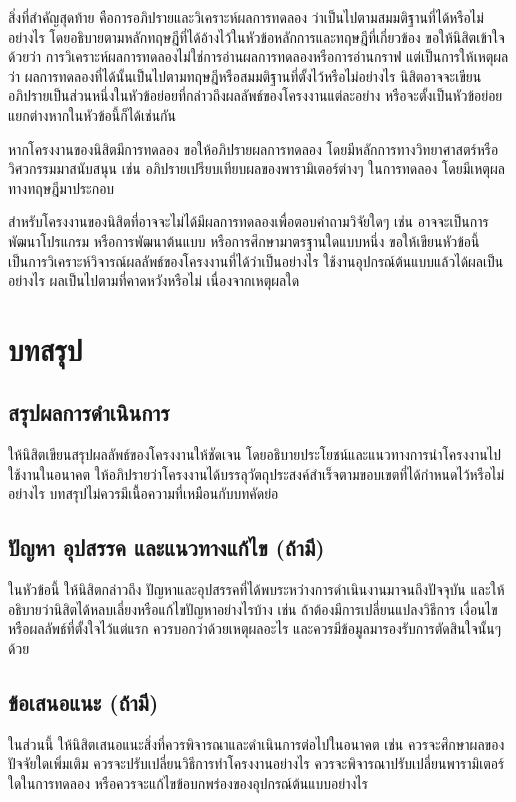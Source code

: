 \documentclass[11pt,a4paper]{article}
\begin{document}
สิ่งที่สำคัญสุดท้าย คือการอภิปรายและวิเคราะห์ผลการทดลอง ว่าเป็นไปตามสมมติฐานที่ได้หรือไม่อย่างไร โดยอธิบายตามหลักทฤษฎีที่ได้อ้างไว้ในหัวข้อหลักการและทฤษฎีที่เกี่ยวข้อง ขอให้นิสิตเข้าใจด้วยว่า การวิเคราะห์ผลการทดลองไม่ใช่การอ่านผลการทดลองหรือการอ่านกราฟ แต่เป็นการให้เหตุผลว่า ผลการทดลองที่ได้นั้นเป็นไปตามทฤษฎีหรือสมมติฐานที่ตั้งไว้หรือไม่อย่างไร นิสิตอาจจะเขียนอภิปรายเป็นส่วนหนึ่งในหัวข้อย่อยที่กล่าวถึงผลลัพธ์ของโครงงานแต่ละอย่าง หรือจะตั้งเป็นหัวข้อย่อยแยกต่างหากในหัวข้อนี้ก็ได้เช่นกัน


หากโครงงานของนิสิตมีการทดลอง ขอให้อภิปรายผลการทดลอง โดยมีหลักการทางวิทยาศาสตร์หรือวิศวกรรมมาสนับสนุน เช่น อภิปรายเปรียบเทียบผลของพารามิเตอร์ต่างๆ ในการทดลอง โดยมีเหตุผลทางทฤษฎีมาประกอบ


สำหรับโครงงานของนิสิตที่อาจจะไม่ได้มีผลการทดลองเพื่อตอบคำถามวิจัยใดๆ เช่น อาจจะเป็นการพัฒนาโปรแกรม หรือการพัฒนาต้นแบบ หรือการศึกษามาตรฐานใดแบบหนึ่ง ขอให้เขียนหัวข้อนี้เป็นการวิเคราะห์วิจารณ์ผลลัพธ์ของโครงงานที่ได้ว่าเป็นอย่างไร ใช้งานอุปกรณ์ต้นแบบแล้วได้ผลเป็นอย่างไร ผลเป็นไปตามที่คาดหวังหรือไม่ เนื่องจากเหตุผลใด

\section{บทสรุป}
\subsection{สรุปผลการดำเนินการ}
ให้นิสิตเขียนสรุปผลลัพธ์ของโครงงานให้ชัดเจน โดยอธิบายประโยชน์และแนวทางการนำโครงงานไปใช้งานในอนาคต ให้อภิปรายว่าโครงงานได้บรรลุวัตถุประสงค์สำเร็จตามขอบเขตที่ได้กำหนดไว้หรือไม่ อย่างไร บทสรุปไม่ควรมีเนื้อความที่เหมือนกับบทคัดย่อ

\subsection{ปัญหา อุปสรรค และแนวทางแก้ไข (ถ้ามี)}
ในหัวข้อนี้ ให้นิสิตกล่าวถึง ปัญหาและอุปสรรคที่ได้พบระหว่างการดำเนินงานมาจนถึงปัจจุบัน และให้อธิบายว่านิสิตได้หลบเลี่ยงหรือแก้ไขปัญหาอย่างไรบ้าง เช่น ถ้าต้องมีการเปลี่ยนแปลงวิธีการ เงื่อนไข หรือผลลัพธ์ที่ตั้งใจไว้แต่แรก ควรบอกว่าด้วยเหตุผลอะไร และควรมีข้อมูลมารองรับการตัดสินใจนั้นๆ ด้วย

\subsection{ข้อเสนอแนะ (ถ้ามี)}
ในส่วนนี้ ให้นิสิตเสนอแนะสิ่งที่ควรพิจารณาและดำเนินการต่อไปในอนาคต เช่น ควรจะศึกษาผลของปัจจัยใดเพิ่มเติม ควรจะปรับเปลี่ยนวิธีการทำโครงงานอย่างไร ควรจะพิจารณาปรับเปลี่ยนพารามิเตอร์ใดในการทดลอง หรือควรจะแก้ไขข้อบกพร่องของอุปกรณ์ต้นแบบอย่างไร
\end{document}
